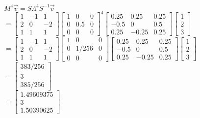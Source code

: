 \documentclass[14pt]{article}
\begin{document}
\begin{center}
    $M^4 \vec{v} = S\Lambda^4 S^{-1} \vec{v}$\\
    $ $\\
    $= \begin{bmatrix}
    1&-1&1\\
    2&0&-2\\
    1&1&1
    \end{bmatrix}
    \begin{bmatrix}
    1&0&0\\
    0&0.5&0\\
    0&0&0
    \end{bmatrix}^4
    \begin{bmatrix}
    0.25&0.25&0.25\\
    -0.5&0&0.5\\
    0.25&-0.25&0.25
    \end{bmatrix}
    \begin{bmatrix}
    1\\
    2\\
    3
    \end{bmatrix}
    $
    $ $\\
    $ $\\
    $ $\\
    
    $= \begin{bmatrix}
    1&-1&1\\
    2&0&-2\\
    1&1&1
    \end{bmatrix}
    \begin{bmatrix}
    1&0&0\\
    0&1/256&0\\
    0&0&0
    \end{bmatrix}
    \begin{bmatrix}
    0.25&0.25&0.25\\
    -0.5&0&0.5\\
    0.25&-0.25&0.25
    \end{bmatrix}
    \begin{bmatrix}
    1\\
    2\\
    3
    \end{bmatrix}
    $
    $ $\\
    $ $\\
    $ $\\
    $= \begin{bmatrix}
    383/256\\
    3\\
    385/256
    \end{bmatrix}$\\
    $ $\\
    $ $\\
    $= \begin{bmatrix}
    1.49609375\\
    3\\
    1.50390625
    \end{bmatrix}$
\end{center}
\end{document}
